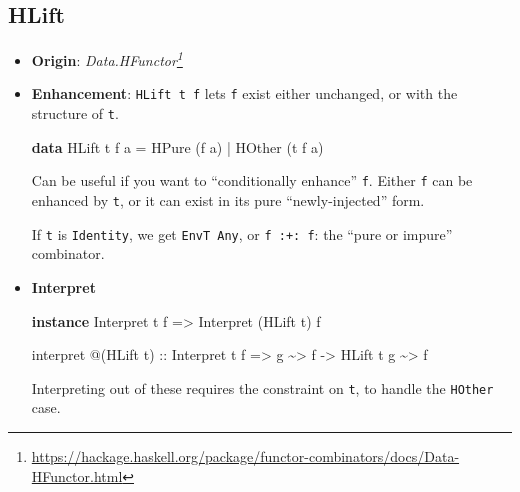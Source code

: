 \documentclass[]{article}
\newenvironment{Shaded}{}{}
\newcommand{\DataTypeTok}[1]{\textcolor[rgb]{0.56,0.13,0.00}{#1}}
\newcommand{\KeywordTok}[1]{\textcolor[rgb]{0.00,0.44,0.13}{\textbf{#1}}}
\newcommand{\NormalTok}[1]{#1}
\newcommand{\OperatorTok}[1]{\textcolor[rgb]{0.40,0.40,0.40}{#1}}
\newcommand{\OtherTok}[1]{\textcolor[rgb]{0.00,0.44,0.13}{#1}}
\renewcommand{\href}[2]{#2\footnote{\url{#1}}}
\begin{document}
\subsection{HLift}\label{hlift}

\begin{itemize}
\item
  \textbf{Origin}:
  \emph{\href{https://hackage.haskell.org/package/functor-combinators/docs/Data-HFunctor.html}{Data.HFunctor}}
\item
  \textbf{Enhancement}: \texttt{HLift\ t\ f} lets \texttt{f} exist either
  unchanged, or with the structure of \texttt{t}.

\begin{Shaded}
\begin{Highlighting}[]
\KeywordTok{data} \DataTypeTok{HLift}\NormalTok{ t f a}
    \OtherTok{=} \DataTypeTok{HPure}\NormalTok{  (f a)}
    \OperatorTok{|} \DataTypeTok{HOther}\NormalTok{ (t f a)}
\end{Highlighting}
\end{Shaded}

  Can be useful if you want to ``conditionally enhance'' \texttt{f}. Either
  \texttt{f} can be enhanced by \texttt{t}, or it can exist in its pure
  ``newly-injected'' form.

  If \texttt{t} is \texttt{Identity}, we get \texttt{EnvT\ Any}, or
  \texttt{f\ :+:\ f}: the ``pure or impure'' combinator.
\item
  \textbf{Interpret}

\begin{Shaded}
\begin{Highlighting}[]
\KeywordTok{instance} \DataTypeTok{Interpret}\NormalTok{ t f }\OtherTok{=\textgreater{}} \DataTypeTok{Interpret}\NormalTok{ (}\DataTypeTok{HLift}\NormalTok{ t) f}

\NormalTok{interpret }\OperatorTok{@}\NormalTok{(}\DataTypeTok{HLift}\NormalTok{ t)}
\OtherTok{    ::} \DataTypeTok{Interpret}\NormalTok{ t f}
    \OtherTok{=\textgreater{}}\NormalTok{ g }\OperatorTok{\textasciitilde{}\textgreater{}}\NormalTok{ f}
    \OtherTok{{-}\textgreater{}} \DataTypeTok{HLift}\NormalTok{ t g }\OperatorTok{\textasciitilde{}\textgreater{}}\NormalTok{ f}
\end{Highlighting}
\end{Shaded}

  Interpreting out of these requires the constraint on \texttt{t}, to handle the
  \texttt{HOther} case.
\end{itemize}
\end{document}
